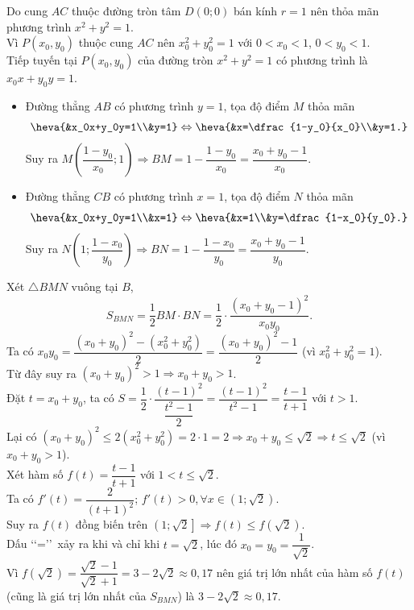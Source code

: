 \begin{ex}
{		Do cung $AC$ thuộc đường tròn tâm $D(0;0)$ bán kính $r=1$ nên thỏa mãn phương trình $x^2+y^2=1$. \\
		Vì $P(x_0,y_0)$ thuộc cung $AC$ nên $x_0^2+y_0^2=1$ với $0<x_0<1$, $0<y_0<1$.\\
		Tiếp tuyến tại $P(x_0,y_0)$ của đường tròn $x^2+y^2=1$ có phương trình là $x_0x+y_0y=1$.
		\begin{itemize}
			\item Đường thẳng $AB$ có phương trình $y=1$, tọa độ điểm $M$ thỏa mãn
			\[\heva{&x_0x+y_0y=1\\&y=1}\Leftrightarrow \heva{&x=\dfrac{1-y_0}{x_0}\\&y=1.}
			\]
			Suy ra $M\left(\dfrac{1-y_0}{x_0};1\right) \Rightarrow BM=1-\dfrac{1-y_0}{x_0}=\dfrac{x_0+y_0-1}{x_0}$.
			\item Đường thẳng $CB$ có phương trình $x=1$, tọa độ điểm $N$ thỏa mãn
			\[\heva{&x_0x+y_0y=1\\&x=1}\Leftrightarrow \heva{&x=1\\&y=\dfrac{1-x_0}{y_0}.}
			\]
			Suy ra $N\left(1;\dfrac{1-x_0}{y_0}\right) \Rightarrow BN=1-\dfrac{1-x_0}{y_0}=\dfrac{x_0+y_0-1}{y_0}$.
		\end{itemize}
		Xét $\triangle BMN$ vuông tại $B$,
		\[
		S_{BMN}=\dfrac{1}{2} BM\cdot BN=\dfrac{1}{2}\cdot\dfrac{(x_0+y_0-1)^2}{x_0y_0}.
		\]
		Ta có $x_0y_0=\dfrac{\left(x_0+y_0\right)^2-\left(x_0^2+y_0^2\right)}{2}=\dfrac{\left(x_0+y_0\right)^2-1}{2}$ (vì $x_0^2+y_0^2=1$).\\
		Từ đây suy ra $\left(x_0+y_0\right)^2>1\Rightarrow x_0+y_0>1$.\\
		Đặt $t=x_0+y_0$, ta có
		$	S=\dfrac{1}{2}\cdot\dfrac{(t-1)^2}{\dfrac{t^2-1}{2}}=\dfrac{(t-1)^2}{t^2-1}=\dfrac{t-1}{t+1}$ với $t>1$.\\
		Lại có $\left(x_0+y_0\right)^2\leq 2\left(x_0^2+y_0^2\right)=2\cdot 1=2\Rightarrow x_0+y_0 \leq \sqrt{2}\Rightarrow t\leq \sqrt{2}$ (vì $x_0+y_0>1$).\\
		Xét hàm số $f(t)=\dfrac{t-1}{t+1}$ với $1<t\le\sqrt2$.\\
		Ta có $f'(t)=\dfrac{2}{(t+1)^2}$; $f'(t)>0$,\,$\forall x\in \left(1;\sqrt2\right)$.\\
		Suy ra $f(t)$ đồng biến trên $\left(1;\sqrt2\right]\Rightarrow f(t)\leq f\left(\sqrt2\right)$.\\
		Dấu \lq\lq=\rq\rq\ xảy ra khi và chỉ khi $t= \sqrt2$, lúc đó $x_0=y_0=\dfrac{1}{\sqrt{2}}$.\\
		Vì $f\left(\sqrt2\right)=\dfrac{\sqrt2-1}{\sqrt2+1}=3-2\sqrt2\approx0{,}17$	nên giá trị lớn nhất của hàm số $f(t)$ (cũng là giá trị lớn nhất của $S_{BMN}$) là $3-2\sqrt2\approx0{,}17$.\\
}
\end{ex}
